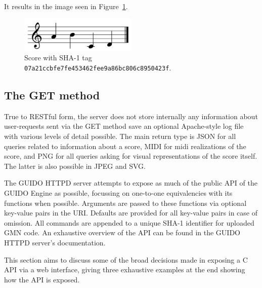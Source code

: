 \documentclass{article}
\begin{document}
It results in the image seen in Figure~\ref{fig:figure1}.
\begin{figure}[h]
  \centering
    \includegraphics[width=0.5\textwidth]{figure1}
  \cprotect\caption{\label{fig:figure1}Score with SHA-1 tag \verb=07a21ccbfe7fe453462fee9a86bc806c8950423f=.}
\end{figure}


\subsection{The GET method}
True to RESTful form, the server does not store internally any information about user-requests sent via the GET method save an optional Apache-style log file with various levels of detail possible.  The main return type is JSON for all queries related to information about a score, MIDI for midi realizations of the score, and PNG for all queries asking for visual representations of the score itself.  The latter is also possible in JPEG and SVG.\par
The GUIDO HTTPD server attempts to expose as much of the public API of the GUIDO Engine as possible, focussing on one-to-one equivalencies with its functions when possible.  Arguments are passed to these functions via optional key-value pairs in the URI.  Defaults are provided for all key-value pairs in case of omission.  All commands are appended to a unique SHA-1 identifier for uploaded GMN code. An exhaustive overview of the API can be found in the GUIDO HTTPD server's documentation\cite{guidoserverdoc}.\par
This section aims to discuss some of the broad decisions made in exposing a C API via a web interface, giving three exhaustive examples at the end showing how the API is exposed.
\end{document}
